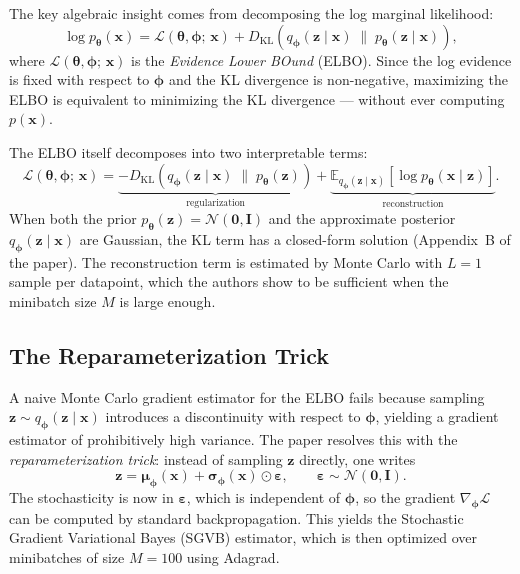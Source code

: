 \documentclass{article}
\begin{document}
The key algebraic insight comes from decomposing the log marginal likelihood:
\[
  \log p_{\boldsymbol{\theta}}(\mathbf{x})
  = \mathcal{L}(\boldsymbol{\theta}, \boldsymbol{\phi};\, \mathbf{x})
  + D_{\mathrm{KL}}\!\left(q_{\boldsymbol{\phi}}(\mathbf{z} \mid \mathbf{x})
    \;\|\; p_{\boldsymbol{\theta}}(\mathbf{z} \mid \mathbf{x})\right),
\]
where $\mathcal{L}(\boldsymbol{\theta}, \boldsymbol{\phi};\, \mathbf{x})$ is the
\emph{Evidence Lower BOund} (ELBO). Since the log evidence is fixed with respect to
$\boldsymbol{\phi}$ and the KL divergence is non-negative, maximizing the ELBO is
equivalent to minimizing the KL divergence --- without ever computing $p(\mathbf{x})$.

The ELBO itself decomposes into two interpretable terms:
\[
  \mathcal{L}(\boldsymbol{\theta}, \boldsymbol{\phi};\, \mathbf{x})
  = \underbrace{-D_{\mathrm{KL}}\!\left(q_{\boldsymbol{\phi}}(\mathbf{z} \mid \mathbf{x})
    \;\|\; p_{\boldsymbol{\theta}}(\mathbf{z})\right)}_{\text{regularization}}
  + \underbrace{\mathbb{E}_{q_{\boldsymbol{\phi}}(\mathbf{z} \mid \mathbf{x})}
    \!\left[\log p_{\boldsymbol{\theta}}(\mathbf{x} \mid \mathbf{z})\right]}_{\text{reconstruction}}.
\]
When both the prior $p_{\boldsymbol{\theta}}(\mathbf{z}) = \mathcal{N}(\mathbf{0}, \mathbf{I})$
and the approximate posterior $q_{\boldsymbol{\phi}}(\mathbf{z} \mid \mathbf{x})$ are
Gaussian, the KL term has a closed-form solution (Appendix~B of the paper).
The reconstruction term is estimated by Monte Carlo with $L=1$ sample per datapoint,
which the authors show to be sufficient when the minibatch size $M$ is large enough.

\subsection{The Reparameterization Trick}

A naive Monte Carlo gradient estimator for the ELBO fails because sampling
$\mathbf{z} \sim q_{\boldsymbol{\phi}}(\mathbf{z} \mid \mathbf{x})$
introduces a discontinuity with respect to $\boldsymbol{\phi}$, yielding
a gradient estimator of prohibitively high variance.
The paper resolves this with the \emph{reparameterization trick}: instead of
sampling $\mathbf{z}$ directly, one writes
\[
  \mathbf{z} = \boldsymbol{\mu}_{\boldsymbol{\phi}}(\mathbf{x})
             + \boldsymbol{\sigma}_{\boldsymbol{\phi}}(\mathbf{x}) \odot \boldsymbol{\varepsilon},
  \qquad \boldsymbol{\varepsilon} \sim \mathcal{N}(\mathbf{0}, \mathbf{I}).
\]
The stochasticity is now in $\boldsymbol{\varepsilon}$, which is independent of
$\boldsymbol{\phi}$, so the gradient $\nabla_{\boldsymbol{\phi}} \mathcal{L}$ can
be computed by standard backpropagation.
This yields the Stochastic Gradient Variational Bayes (SGVB) estimator, which
is then optimized over minibatches of size $M = 100$ using Adagrad.
\end{document}
